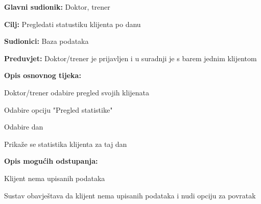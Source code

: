 				\noindent {}
				\begin{packed_item}
					
					\item \textbf{Glavni sudionik:} Doktor, trener
					\item  \textbf{Cilj:} Pregledati statustiku klijenta po danu
					\item  \textbf{Sudionici:} Baza podataka
					\item  \textbf{Preduvjet:} Doktor/trener je prijavljen i u suradnji je s barem jednim klijentom
					\item  \textbf{Opis osnovnog tijeka:}
					
					\item[] \begin{packed_enum}
						
						\item Doktor/trener odabire pregled svojih klijenata
						\item Odabire opciju "Pregled statistike" 
						\item Odabire dan
						\item Prikaže se statistika klijenta za taj dan
						
					\end{packed_enum}
				
					\item  \textbf{Opis mogućih odstupanja:}
					
					\item[] \begin{packed_item}
						
						\item[2.a] Klijent nema upisanih podataka 
						\item[] \begin{packed_enum}
							
							\item Sustav obavještava da klijent nema upisanih podataka i nudi opciju za povratak
						\end{packed_enum}
						
					\end{packed_item}	
					
				\end{packed_item}
			
